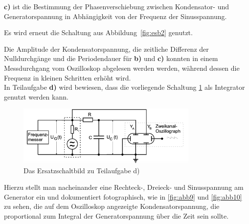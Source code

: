 \textbf{c)} ist die Bestimmung der Phasenverschiebung zwischen Kondensator- und 
Generatorspannung in Abhängigkeit von der Frequenz der Sinusspannung. 

Es wird erneut die Schaltung aus Abbildung~\ref{fig:esb2} genutzt.

Die Amplitude der Kondensatorspannung, die zeitliche Differenz der Nulldurchgänge und die Periodendauer für \textbf{b)} und \textbf{c)} konnten in einem 
Messdurchgang vom Oszilloskop abgelesen werden werden, während dessen die Frequenz in kleinen Schritten erhöht wird. \\

In Teilaufgabe \textbf{d)} wird bewiesen, dass die vorliegende Schaltung \ref{fig:esb3} als Integrator genutzt werden kann.

\begin{figure}
    
    \centering
    \includegraphics[height=3cm]{content/esb3.png}
    \caption{Das Ersatzschaltbild zu Teilaufgabe d)}
    \label{fig:esb3}
\end{figure}

Hierzu stellt man nacheinander eine Rechteck-, Dreieck- und Sinusspannung am Generator ein und dokumentiert 
fotographisch, wie in \ref{fig:abb9} und \ref{fig:abb10} zu sehen, die auf dem Oszilloskop angezeigte Kondensatorspannung, 
die proportional zum Integral der Generatorspannung über die Zeit sein sollte. \\




